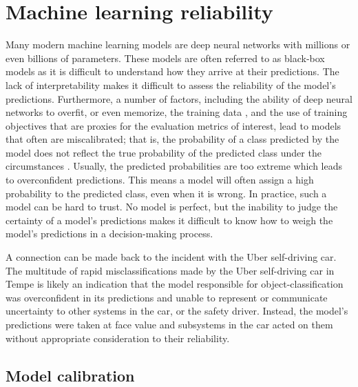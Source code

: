



\section{Machine learning reliability}
%
Many modern machine learning models are deep neural networks with millions or even billions of parameters. 
These models are often referred to as black-box models as it is difficult to understand how they arrive at their predictions. 
The lack of interpretability makes it difficult to assess the reliability of the model's predictions. 
Furthermore, a number of factors, including the ability of deep neural networks to overfit, or even memorize, the training data \cite{arpit_closer_2017, burg_memorization_2021}, and the use of training objectives that are proxies for the evaluation metrics of interest, lead to models that often are miscalibrated; that is, the probability of a class predicted by the model does not reflect the true probability of the predicted class under the circumstances \cite{guo_calibration_2017, kull_temperature_2019}. Usually, the predicted probabilities are too extreme which leads to overconfident predictions. This means a model will often assign a high probability to the predicted class, even when it is wrong. 
In practice, such a model can be hard to trust. No model is perfect, but the inability to judge the certainty of a model's predictions makes it difficult to know how to weigh the model's predictions in a decision-making process. 

A connection can be made back to the incident with the Uber self-driving car. 
The multitude of rapid misclassifications made by the Uber self-driving car in Tempe is likely an indication that the model responsible for object-classification was overconfident in its predictions and unable to represent or communicate uncertainty to other systems in the car, or the safety driver. Instead, the model's predictions were taken at face value and subsystems in the car acted on them without appropriate consideration to their reliability.   


\subsection{Model calibration}

